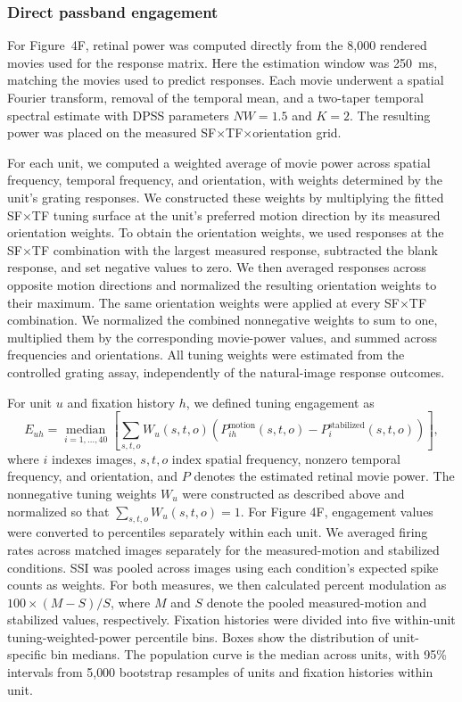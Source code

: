 \documentclass{lite}
\begin{document}
\subsubsection{Direct passband engagement}

For Figure~4F, retinal power was computed directly from the 8{,}000 rendered movies used for the response matrix. Here the estimation window was 250~ms, matching the movies used to predict responses. Each movie underwent a spatial Fourier transform, removal of the temporal mean, and a two-taper temporal spectral estimate with DPSS parameters $NW=1.5$ and $K=2$. The resulting power was placed on the measured SF$\times$TF$\times$orientation grid.

For each unit, we computed a weighted average of movie power across spatial frequency, temporal frequency, and orientation, with weights determined by the unit's grating responses. We constructed these weights by multiplying the fitted SF×TF tuning surface at the unit's preferred motion direction by its measured orientation weights. To obtain the orientation weights, we used responses at the SF×TF combination with the largest measured response, subtracted the blank response, and set negative values to zero. We then averaged responses across opposite motion directions and normalized the resulting orientation weights to their maximum. The same orientation weights were applied at every SF×TF combination. We normalized the combined nonnegative weights to sum to one, multiplied them by the corresponding movie-power values, and summed across frequencies and orientations. All tuning weights were estimated from the controlled grating assay, independently of the natural-image response outcomes.

For unit \(u\) and fixation history \(h\), we defined tuning engagement as $$ E_{uh} = \operatorname*{median}_{i=1,\ldots,40} \left[ \sum_{s,t,o} W_u(s,t,o) \left(P^{\mathrm{motion}}_{ih}(s,t,o) -P^{\mathrm{stabilized}}_i(s,t,o)\right) \right], $$ where \(i\) indexes images, \(s,t,o\) index spatial frequency, nonzero temporal frequency, and orientation, and \(P\) denotes the estimated retinal movie power. The nonnegative tuning weights \(W_u\) were constructed as described above and normalized so that \(\sum_{s,t,o}W_u(s,t,o)=1\). For Figure 4F, engagement values were converted to percentiles separately within each unit. We averaged firing rates across matched images separately for the measured-motion and stabilized conditions. SSI was pooled across images using each condition’s expected spike counts as weights. For both measures, we then calculated percent modulation as $100 \times (M-S)/S$, where $M$ and $S$ denote the pooled measured-motion and stabilized values, respectively. Fixation histories were divided into five within-unit tuning-weighted-power percentile bins. Boxes show the distribution of unit-specific bin medians. The population curve is the median across units, with 95\% intervals from 5{,}000 bootstrap resamples of units and fixation histories within unit.
\end{document}
